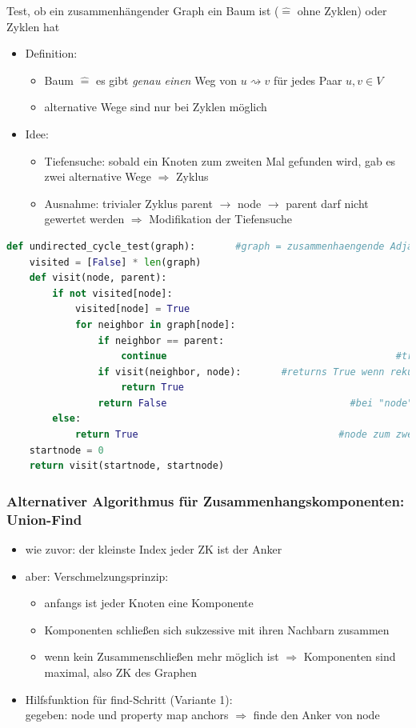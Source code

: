 \documentclass[11pt, fleqn]{scrreprt}
\begin{document}
			Test, ob ein zusammenhängender Graph ein Baum ist ($\widehat{=}$ ohne Zyklen) oder Zyklen hat
			\begin{itemize}
			\item Definition: 
			\begin{itemize}
			\item Baum $\widehat{=}$ es gibt \emph{genau einen} Weg von $u \rightsquigarrow v$ für jedes Paar $u, v \in V$
			\item alternative Wege sind nur bei Zyklen möglich
			\end{itemize}
			\item Idee:
			\begin{itemize}
			\item Tiefensuche: sobald ein Knoten zum zweiten Mal gefunden wird, gab es zwei alternative Wege $\Rightarrow$ Zyklus
			\item Ausnahme: trivialer Zyklus parent $\rightarrow$ node $\rightarrow$ parent darf nicht gewertet werden $\Rightarrow$ Modifikation der Tiefensuche
			\end{itemize}
			\end{itemize}
			
			\begin{lstlisting}[language=Python]
def undirected_cycle_test(graph): 		#graph = zusammenhaengende Adjazenzliste
	visited = [False] * len(graph)
	def visit(node, parent):
		if not visited[node]:
			visited[node] = True
			for neighbor in graph[node]:
				if neighbor == parent: 
					continue 										#trivialen Zyklus ueberspringen
				if visit(neighbor, node):   	#returns True wenn rekursiv Zyklus gefunden wurde
					return True
				return False    							#bei "node" kein Zyklus gefunden
		else:
			return True    								  #node zum zweiten Mal besucht => Zyklus
	startnode = 0
	return visit(startnode, startnode)
			\end{lstlisting}
			
		\subsubsection*{Alternativer Algorithmus für Zusammenhangskomponenten: Union-Find}
			
			\begin{itemize}
				\item wie zuvor: der kleinste Index jeder ZK ist der Anker 
				\item aber: Verschmelzungsprinzip:
				\begin{itemize}
					\item anfangs ist jeder Knoten eine Komponente
					\item Komponenten schließen sich sukzessive mit ihren Nachbarn zusammen
					\item wenn kein Zusammenschließen mehr möglich ist $\Rightarrow$ Komponenten sind maximal, also ZK des Graphen 
				\end{itemize}
				\item Hilfsfunktion für find-Schritt (Variante 1): \\
				gegeben: node und property map anchors $\Rightarrow$ finde den Anker von node
			\end{itemize}
			
\end{document}
